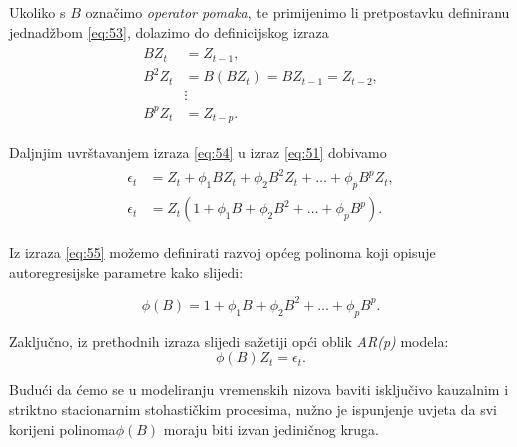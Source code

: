 \documentclass[a4paper,12pt,oneside]{memoir}
\begin{document}
            Ukoliko s $B$ označimo \textit{operator pomaka}, te primijenimo li pretpostavku definiranu jednadžbom \eqref{eq:53}, dolazimo do definicijskog izraza
            \begin{align}
                \begin{split}
                    BZ_t&=Z_{t-1},\\
                    B^2Z_t&=B(BZ_t)=BZ_{t-1}=Z_{t-2},\\
                    &\vdots\\
                    B^pZ_t&=Z_{t-p}.
                \end{split}
                \label{eq:54}
            \end{align}

            Daljnjim uvrštavanjem izraza \eqref{eq:54} u izraz \eqref{eq:51} dobivamo
            \begin{align}
                \begin{split}
                    \epsilon_t&=Z_t+\phi_1BZ_t+\phi_2B^2Z_t+\ldots+\phi_pB^pZ_t,\\
                    \epsilon_t&=Z_t(1+\phi_1B+\phi_2B^2+\ldots+\phi_pB^p).
                \end{split}
                \label{eq:55}
            \end{align}
        
            Iz izraza \eqref{eq:55} možemo definirati razvoj općeg polinoma koji opisuje autoregresijske parametre kako slijedi:

            \begin{equation}
                \phi(B)=1+\phi_1B+\phi_2B^2+\ldots+\phi_pB^p.
                \label{eq:56}
            \end{equation}

            Zaključno, iz prethodnih izraza slijedi sažetiji opći oblik \textit{AR(p)} modela:
            \begin{equation}
                \phi(B)Z_t=\epsilon_t.
                \label{eq:57}
            \end{equation}

            Budući da ćemo se u modeliranju vremenskih nizova baviti isključivo kauzalnim i striktno stacionarnim stohastičkim procesima, nužno je ispunjenje uvjeta da svi korijeni polinoma\footnotemark[5] $\phi(B)$ moraju biti izvan jediničnog kruga.

            
\end{document}
